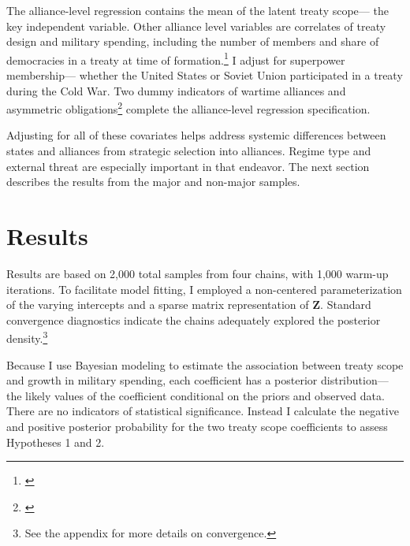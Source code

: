 \documentclass[12pt]{article}
\begin{document}
The alliance-level regression contains the mean of the latent treaty scope--- the key independent variable. 
Other alliance level variables are correlates of treaty design and military spending, including the number of members and share of democracies in a treaty at time of formation.\footnote{\cite{Chibaetal2015}} 
I adjust for superpower membership--- whether the United States or Soviet Union participated in a treaty during the Cold War. 
Two dummy indicators of wartime alliances and asymmetric obligations\footnote{\cite{Leedsetal2002}} complete the alliance-level regression specification. 


Adjusting for all of these covariates helps address systemic differences between states and alliances from strategic selection into alliances. 
Regime type and external threat are especially important in that endeavor. 
The next section describes the results from the major and non-major samples.
 

\section{Results}


Results are based on 2,000 total samples from four chains, with 1,000 warm-up iterations. 
To facilitate model fitting, I employed a non-centered parameterization of the varying intercepts and a sparse matrix representation of \textbf{Z}. 
Standard convergence diagnostics indicate the chains adequately explored the posterior density.\footnote{See the appendix for more details on convergence.} 


Because I use Bayesian modeling to estimate the association between treaty scope and growth in military spending, each coefficient has a posterior distribution--- the likely values of the coefficient conditional on the priors and observed data.
There are no indicators of statistical significance. 
Instead I calculate the negative and positive posterior probability for the two treaty scope coefficients to assess Hypotheses 1 and 2.
\end{document}
